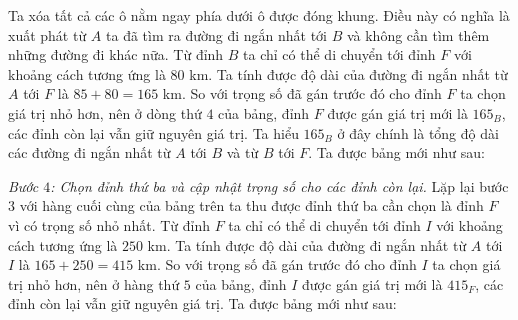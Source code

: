 \begin{multicols}{2}
	\vskip 0.1cm
	Ta xóa tất cả các ô nằm ngay phía dưới ô được đóng khung. Điều này có nghĩa là xuất phát từ $A$ ta đã tìm ra đường đi ngắn nhất tới $B$ và không cần tìm thêm những đường đi khác nữa. 
	\vskip 0.1cm
	Từ đỉnh $B$ ta chỉ có thể di chuyển tới đỉnh $F$ với khoảng cách tương ứng là $80$ km. Ta tính được độ dài của đường đi ngắn nhất từ $A$ tới $F$ là $85+80=165$ km. So với trọng số đã gán trước đó cho đỉnh $F$ ta chọn giá trị nhỏ hơn, nên ở dòng thứ $4$ của bảng, đỉnh $F$ được gán giá trị mới là $165_B$, các đỉnh còn lại vẫn giữ nguyên giá trị. Ta hiểu $165_B$ ở đây chính là tổng độ dài các đường đi ngắn nhất từ $A$ tới $B$ và từ $B$ tới $F$.
	\vskip 0.1cm 
	Ta được bảng mới như sau: 
	\begin{table}[H]
		\vspace*{-5pt}
		\centering
		\captionsetup{labelformat= empty, justification=centering}
		\vspace*{-10pt}
	\end{table}
	\textit{Bước $4$: Chọn đỉnh thứ ba và cập nhật trọng số cho các đỉnh còn lại.}  Lặp lại bước $3$ với hàng cuối cùng của bảng trên ta thu được đỉnh thứ ba cần chọn là đỉnh $F$ vì có trọng số nhỏ nhất. Từ đỉnh $F$ ta chỉ có thể di chuyển tới đỉnh $I$ với khoảng cách tương ứng là $250$ km. Ta tính được độ dài của đường đi ngắn nhất từ $A$ tới $I$ là $165+250=415$ km. So với trọng số đã gán trước đó cho đỉnh $I$ ta chọn giá trị nhỏ hơn, nên ở hàng thứ $5$ của bảng, đỉnh $I$ được gán giá trị mới là $415_F$, các đỉnh còn lại vẫn giữ nguyên giá trị. 
	\vskip 0.1cm
	Ta được bảng mới như sau: 
	\begin{table}[H]
		\vspace*{-5pt}
		\centering
		\captionsetup{labelformat= empty, justification=centering}
\end{table}
\end{multicols}
